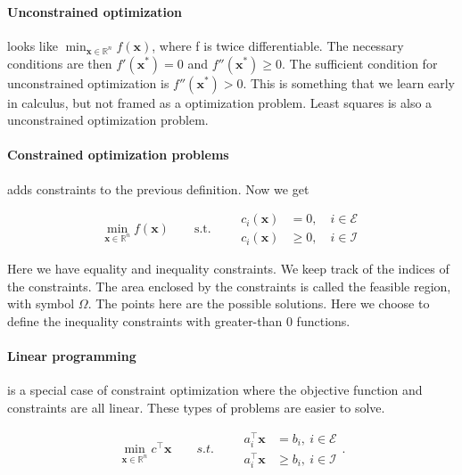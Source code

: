 \documentclass{article}
\begin{document}
\paragraph{Unconstrained optimization} looks like $\min_{\mathbf{x}\in \mathbb{R}^{n}} f(\mathbf{x})$, where f is twice differentiable.
The necessary conditions are then
$f'(\mathbf{x^*}) = 0$
and
$f''(\mathbf{x^*}) \geq 0$. The sufficient condition for unconstrained optimization is
$f''(\mathbf{x^*}) > 0$. This is something that we learn early in calculus, but not framed as a optimization problem. Least squares is also a
unconstrained optimization problem.

\paragraph{Constrained optimization problems} adds constraints to the previous definition. Now we get

\[
  \min_{\mathbf{x} \in \mathbb{R}^{n}} f(\mathbf{x}) \qquad \text{s.t.} \qquad
  \begin{aligned}
    c_i(\mathbf{x}) & = 0, \quad i \in \mathcal{E}    \\
    c_i(\mathbf{x}) & \geq 0, \quad i \in \mathcal{I}
  \end{aligned}
\]

Here we have equality and inequality constraints. We keep track of the indices of the constraints. The area
enclosed by the constraints is called the feasible region, with symbol $\Omega$. The points here are the possible solutions.
Here we choose to define the inequality constraints with greater-than 0 functions.

\paragraph{Linear programming} is a special case of constraint optimization where the objective function and
constraints are all linear. These types of problems are easier to solve.

\[
  \min_{\mathbf{x} \in \mathbb{R}^{n}} c^{\top}\mathbf{x} \qquad s.t. \qquad
  \begin{aligned}
    a_i ^{\top}\mathbf{x} & = b_i,\ i\in \mathcal{E}    \\
    a_i^{\top}\mathbf{x}  & \geq b_i,\ i\in \mathcal{I}
  \end{aligned}
  .\]
\end{document}
